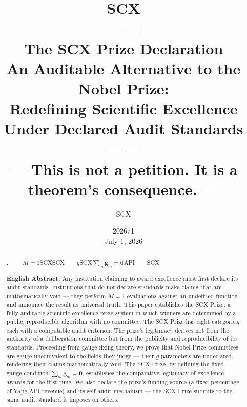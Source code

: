 \documentclass[12pt,a4paper]{article}
\title{
    \textbf{\LARGE SCX\\[6pt]
    ——}\\[14pt]
    \large
    The SCX Prize Declaration\\[4pt]
    An Auditable Alternative to the Nobel Prize:\\[2pt]
    Redefining Scientific Excellence Under Declared Audit Standards\\[10pt]
    \normalsize
    ---  ---\\[2pt]
    --- This is not a petition. It is a theorem's consequence. ---
}
\author{SCX}\\[6pt]
\date{202671 \\[2pt] July 1, 2026}
\theoremstyle{remark}
\newcommand{\sumgd}{\sum_m \mathbf{g}_m = \mathbf{0}}
\begin{document}
\maketitle

\begin{abstract}

\noindent\textbf{.}
——$M=1$SCXSCX——$g$SCX$\sumgd$API——SCX

\medskip
\noindent\textbf{English Abstract.}
Any institution claiming to award excellence must first declare its audit standards. Institutions that do not declare standards make claims that are mathematically void — they perform $M=1$ evaluations against an undefined function and announce the result as universal truth. This paper establishes the SCX Prize: a fully auditable scientific excellence prize system in which winners are determined by a public, reproducible algorithm with no committee. The SCX Prize has eight categories, each with a computable audit criterion. The prize's legitimacy derives not from the authority of a deliberation committee but from the publicity and reproducibility of its standards. Proceeding from gauge-fixing theory, we prove that Nobel Prize committees are gauge-unequivalent to the fields they judge — their $g$ parameters are undeclared, rendering their claims mathematically void. The SCX Prize, by defining the fixed gauge condition $\sumgd$, establishes the comparative legitimacy of excellence awards for the first time. We also declare the prize's funding source (a fixed percentage of Yajie API revenue) and its self-audit mechanism — the SCX Prize submits to the same audit standard it imposes on others.

\end{abstract}

\newpage

\tableofcontents
\newpage

\section*{}
\label{sec:preamble}
\end{document}
